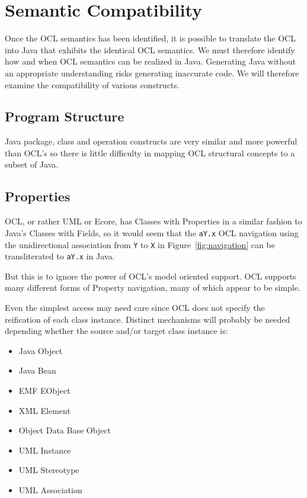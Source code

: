 \documentclass[sigconf]{acmart}
\begin{document}
\section{Semantic Compatibility}\label{Semantic Compatibility}

Once the OCL semantics has been identified, it is possible to translate the OCL into Java that exhibits the identical OCL semantics. We must therefore identify how and when OCL semantics can be realized in Java. Generating Java without an appropriate understanding risks generating inaccurate code. We will therefore examine the compatibility of various constructs.

\subsection{Program Structure}
	
Java package, class and operation constructs are very similar and more powerful than OCL's so there is little difficulty in mapping OCL structural concepts to a subset of Java.

\subsection{Properties}\label{Properties}

OCL, or rather UML or Ecore, has Classes with Properties in a similar fashion to Java's Classes with Fields, so it would seem that the \verb|aY.x| OCL navigation using the unidirectional association from \verb|Y| to \verb|X| in Figure~\ref{fig:navigation} can be transliterated to \verb|aY.x| in Java.

But this is to ignore the power of OCL's model oriented support. OCL supports many different forms of Property navigation, many of which appear to be simple.

Even the simplest access may need care since OCL does not specify the reification of each class instance. Distinct mechanisms will probably be needed depending whether the source and/or target class instance is:
\begin{itemize}
	\item Java Object
	\item Java Bean
	\item EMF EObject
	\item XML Element
	\item Object Data Base Object
	\item UML Instance
	\item UML Stereotype
	\item UML Association
\end{itemize} 
\end{document}
